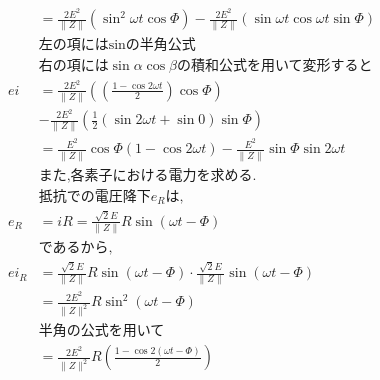 \documentclass[twocolumn]{article}
\begin{document}
\begin{enumerate}
\begin{align*}
               & = \frac{2E^2}{\|Z\|} \left(\sin^2 \omega t \cos \Phi \right) - \frac{2E^2}{\|Z\|} \left(\sin\omega t \cos\omega t \sin \Phi\right) \\
               & \text{左の項にはsinの半角公式}                                                                                                               \\
               & \text{右の項には} \sin \alpha \cos \beta \text{の積和公式を用いて変形すると}                                                                          \\
          ei   & = \frac{2E^2}{\|Z\|} \left(\left(\frac{1-\cos2\omega t}{2}\right)\cos \Phi\right)                                                  \\
               & - \frac{2E^2}{\|Z\|}\left(\frac{1}{2}\left(\sin2\omega t + \sin0\right) \sin \Phi\right)                                           \\
               & = \frac{E^2}{\|Z\|} \cos \Phi \left(1-\cos2\omega t\right) - \frac{E^2}{\|Z\|} \sin \Phi\sin2\omega t                              \\
               & \text{また,各素子における電力を求める.}                                                                                                           \\
               & \text{抵抗での電圧降下}e_R \text{は,}                                                                                                       \\
          e_R  & = iR = \frac{\sqrt{2}E}{\|Z\|} R \sin \left( \omega t - \Phi\right)                                                                \\
               & \text{であるから,}                                                                                                                      \\
          ei_R & = \frac{\sqrt{2}E}{\|Z\|} R \sin \left( \omega t - \Phi\right) \cdot \frac{\sqrt{2}E}{\|Z\|} \sin \left( \omega t - \Phi\right)    \\
               & = \frac{2E^2}{\|Z\|^2} R \sin^2 \left(\omega t - \Phi\right)                                                                       \\
               & \text{半角の公式を用いて}                                                                                                                   \\
               & = \frac{2E^2}{\|Z\|^2} R \left( \frac{1-\cos2\left(\omega t - \Phi\right)}{2} \right)                                              \\

\end{align*}
\end{enumerate}
\end{document}
